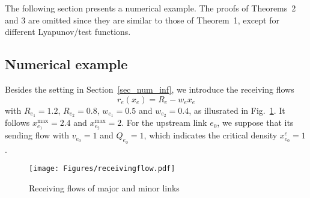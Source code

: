 The following section presents a numerical example. The proofs of Theorems~2 and 3 are omitted since they are similar to those of Theorem~1, except for different Lyapunov/test functions.

\subsection{Numerical example}
Besides the setting in Section~\ref{sec_num_inf}, we introduce the receiving flows
\begin{equation}
    r_e(x_e) = R_e - w_ex_e
\end{equation}
with $R_{e_1}=1.2$, $R_{e_2}=0.8$, $w_{e_1}=0.5$ and $w_{e_2}=0.4$, as illusrated in Fig.~\ref{fig_receivingflow}. It follows $x_{e_1}^{\max}=2.4$ and $x_{e_2}^{\max}=2$. For the upstream link $e_0$, we suppose that its sending flow  with $v_{e_0}=1$ and $Q_{e_0}=1$, which indicates the critical density $x_{e_0}^c=1$.
\begin{figure}[htbp]
    \centering
    \texttt{[image: Figures/receivingflow.pdf]}
    \caption{Receiving flows of major and minor links}
    \label{fig_receivingflow}
\end{figure}

